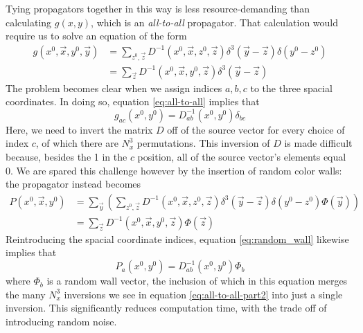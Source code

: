Tying propagators together in this way is less resource-demanding than calculating $g(x,y)$, which is an \textit{all-to-all} propagator.  That calculation would require us to solve an equation of the form
\begin{equation}\label{eq:all-to-all}
\begin{split}
    g(x^0,\vec{x},y^0,\vec{y}) &= \sum_{z^0,\vec{z}}D^{-1}(x^0,\vec{x},z^0,\vec{z})\delta^3(\vec{y}-\vec{z})\delta(y^0-z^0)\\
    &= \sum_{\vec{z}} D^{-1}(x^0,\vec{x},y^0,\vec{z})\delta^3(\vec{y}-\vec{z})
\end{split}
\end{equation}
The problem becomes clear when we assign indices $a,b,c$ to the three spacial coordinates. In doing so, equation \ref{eq:all-to-all} implies that%
\begin{equation}\label{eq:all-to-all-part2}
    g_{ac}(x^0,y^0) = D^{-1}_{ab}(x^0,y^0)\delta_{bc}
\end{equation}
Here, we need to invert the matrix $D$ off of the source vector for every choice of index $c$, of which there are $N^3_x$ permutations.  This inversion of $D$ is made difficult because, besides the 1 in the $c$ position, all of the source vector's elements equal 0.  We are spared this challenge however by the insertion of random color walls: the propagator instead becomes
\begin{equation}\label{eq:random_wall}
\begin{split}
    P(x^0,\vec{x},y^0) &= \sum_{\vec{y}} \left(
    \sum_{z^0,\vec{z}}D^{-1}(x^0,\vec{x},z^0,\vec{z})\delta^3(\vec{y}-\vec{z})\delta(y^0-z^0)\Phi(\vec{y}) \right)\\
    &= \sum_{\vec{z}}D^{-1}(x^0,\vec{x},y^0,\vec{z})\Phi(\vec{z})
\end{split}
\end{equation}
Reintroducing the spacial coordinate indices, equation \ref{eq:random_wall} likewise implies that 
\begin{equation}\label{eq:random_Wall_part2}
    P_a(x^0,y^0) = D^{-1}_{ab}(x^0,y^0)\Phi_b
\end{equation}
where $\Phi_b$ is a random wall vector, the inclusion of which in this equation merges the many $N^3_x$ inversions we see in equation \ref{eq:all-to-all-part2} into just a single inversion.  This significantly reduces computation time, with the trade off of introducing random noise.

